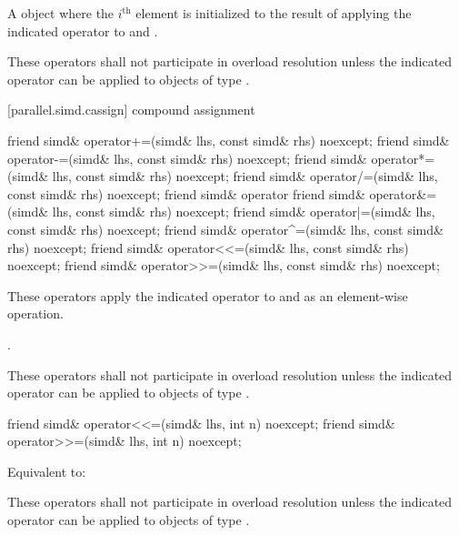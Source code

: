 \begin{itemdescr}
  \pnum\returns
  A  object where the $i^\text{th}$ element is initialized to the result of applying the indicated operator to  and  \foralli.

  \pnum\remarks
  These operators shall not participate in overload resolution unless the indicated operator can be applied to objects of type .
\end{itemdescr}

[parallel.simd.cassign]{ compound assignment}

\begin{itemdecl}
friend simd& operator+=(simd& lhs, const simd& rhs) noexcept;
friend simd& operator-=(simd& lhs, const simd& rhs) noexcept;
friend simd& operator*=(simd& lhs, const simd& rhs) noexcept;
friend simd& operator/=(simd& lhs, const simd& rhs) noexcept;
friend simd& operator%
friend simd& operator&=(simd& lhs, const simd& rhs) noexcept;
friend simd& operator|=(simd& lhs, const simd& rhs) noexcept;
friend simd& operator^=(simd& lhs, const simd& rhs) noexcept;
friend simd& operator<<=(simd& lhs, const simd& rhs) noexcept;
friend simd& operator>>=(simd& lhs, const simd& rhs) noexcept;
\end{itemdecl}

\begin{itemdescr}
  \pnum\effects
  These operators apply the indicated operator to  and  as an element-wise operation.

  \pnum\returns
  .

  \pnum\remarks
  These operators shall not participate in overload resolution unless the indicated operator can be applied to objects of type .
\end{itemdescr}

\begin{itemdecl}
friend simd& operator<<=(simd& lhs, int n) noexcept;
friend simd& operator>>=(simd& lhs, int n) noexcept;
\end{itemdecl}

\begin{itemdescr}
  \pnum\effects
  Equivalent to: 

  \pnum\remarks
  These operators shall not participate in overload resolution unless the indicated operator can be applied to objects of type .
\end{itemdescr}

